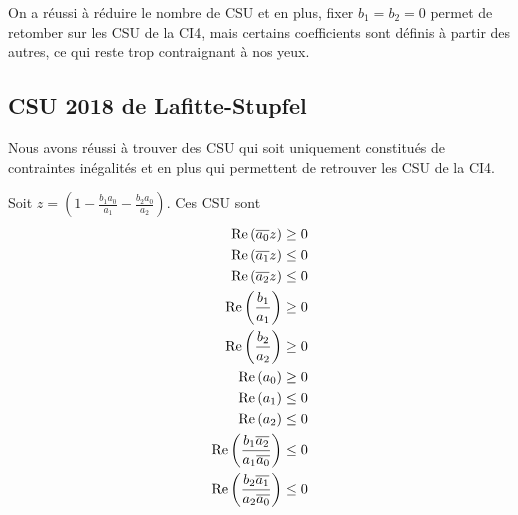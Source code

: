   On a réussi à réduire le nombre de CSU et en plus, fixer \(b_1=b_2=0\) permet de retomber sur les CSU de la CI4, mais certains coefficients sont définis à partir des autres, ce qui reste trop contraignant à nos yeux.

\subsection{CSU 2018 de Lafitte-Stupfel}

  Nous avons réussi à trouver des CSU qui soit uniquement constitués de contraintes inégalités et en plus qui permettent de retrouver les CSU de la CI4.

  \begin{prop}
    Soit \(z = \left(1 - \frac{b_1a_0}{a_1} - \frac{b_2a_0}{a_2}\right) \). Ces CSU sont
    \begin{align}
      \operatorname{Re}\left({\overline{a_0}}z\right) \ge 0
      \\
      \operatorname{Re}\left({\overline{a_1}}z\right) \le 0
      \\
      \operatorname{Re}\left({\overline{a_2}}z\right) \le 0
      \\
      \operatorname{Re}\left(\dfrac{b_1}{a_1}\right) \ge 0
      \\
      \operatorname{Re}\left(\dfrac{b_2}{a_2}\right) \ge 0
      \\
      \operatorname{Re}\left(a_0\right) \ge 0
      \\
      \operatorname{Re}\left(a_1\right) \le 0
      \\
      \operatorname{Re}\left(a_2\right) \le 0
      \\
      \operatorname{Re}\left(\dfrac{b_1{\overline{a_2}}}{a_1{\overline{a_0}}}\right) \le 0
      \\
      \operatorname{Re}\left(\dfrac{b_2{\overline{a_1}}}{a_2{\overline{a_0}}}\right) \le 0
    \end{align}
  \end{prop}

